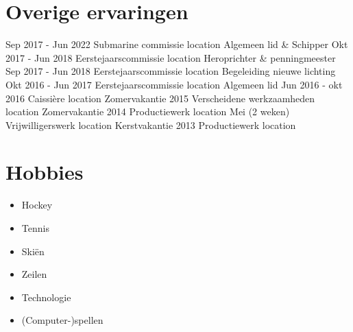 \documentclass[letterpaper]{twentyonesecondcv} %
\begin{document}
{\section{Overige ervaringen}
    
    \begin{twenty}
      \twentyitem
        {Sep 2017 - Jun 2022}
        {Submarine commissie}
        {location}
        {Algemeen lid \& Schipper}
      \twentyitem
        {Okt 2017 - Jun 2018}
        {Eerstejaarscommissie}
        {location}
        {Heroprichter \& penningmeester}
    \twentyitem
        {Sep 2017 - Jun 2018}
        {Eerstejaarscommissie}
        {location}
        {Begeleiding nieuwe lichting}
    \twentyitem
        {Okt 2016 - Jun 2017}
        {Eerstejaarscommissie}
        {location}
        {Algemeen lid}
    \twentyitem
        {Jun 2016 - okt 2016}
        {Caissière}
        {location}
        {}
    \twentyitem
        {Zomervakantie 2015}
        {Verscheidene werkzaamheden}
        {location}
        {}
    \twentyitem
        {Zomervakantie 2014}
        {Productiewerk}
        {location}
        {}
    \twentyitem
        {Mei (2 weken)}
        {Vrijwilligerswerk}
        {location}
        {}
    \twentyitem
        {Kerstvakantie 2013}
        {Productiewerk}
        {location}
        {}
    \end{twenty}

    
    
    \section{Hobbies}
    \begin{itemize}
    \item Hockey
    \item Tennis
    \item Skiën
    \item Zeilen
    \item Technologie
    \item (Computer-)spellen
    \end{itemize}

}
\end{document}
